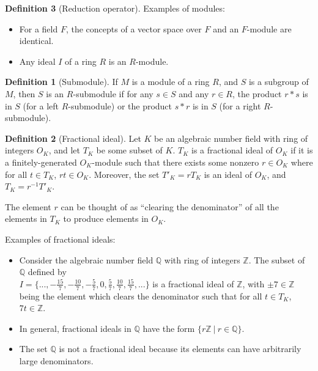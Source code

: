 \documentclass{article}
\theoremstyle{definition}
\newtheorem{definition}{Definition}[section]
\theoremstyle{theorem}
\theoremstyle{example}
\theoremstyle{corollary}
\begin{document}
\begin{definition}[Reduction operator]
\bigskip

Examples of modules:
\begin{itemize}
\item For a field \(F\), the concepts of a vector space over \(F\) and an \(F\)-module are identical.
\item Any ideal \(I\) of a ring \(R\) is an \(R\)-module.
\end{itemize}

\bigskip

\theoremstyle{definition}
\begin{definition}[Submodule]
If \(M\) is a module of a ring \(R\), and \(S\) is a subgroup of \(M\), then \(S\) is an \(R\)-submodule if for any \(s \in S\) and any \(r \in R\), the product \(r * s\) is in \(S\) (for a left \(R\)-submodule) or the product \(s * r\) is in \(S\) (for a right \(R\)-submodule).
\end{definition}

\bigskip

\theoremstyle{definition}
\begin{definition}[Fractional ideal]
Let \(K\) be an algebraic number field with ring of integers \(O_{K}\), and let \(T_{K}\) be some subset of \(K\). \(T_{K}\) is a fractional ideal of \(O_{K}\) if it is a finitely-generated \(O_{K}\)-module such that there exists some nonzero \(r \in O_{K}\) where for all \(t \in T_{K}\), \(r t \in O_{K}\). Moreover, the set \(T'_{K} = r T_{K}\) is an ideal of \(O_{K}\), and \(T_{K} = r^{-1} T'_{K}\).
\end{definition}

\bigskip

The element \(r\) can be thought of as ``clearing the denominator'' of all the elements in \(T_{K}\) to produce elements in \(O_{K}\).

\bigskip

Examples of fractional ideals:
\begin{itemize}
\item Consider the algebraic number field \(\mathbb{Q}\) with ring of integers \(\mathbb{Z}\). The subset of \(\mathbb{Q}\) defined by \\ \(I = \{ . . . , -\frac{15}{7}, -\frac{10}{7}, -\frac{5}{7}, 0, \frac{5}{7}, \frac{10}{7}, \frac{15}{7}, . . . \}\) is a fractional ideal of \(\mathbb{Z}\), with \(\pm 7 \in \mathbb{Z}\) being the element which clears the denominator such that for all \(t \in T_{K}\), \(7t \in \mathbb{Z}\).
\item In general, fractional ideals in \(\mathbb{Q}\) have the form \(\{ r \mathbb{Z} \ | \ r \in \mathbb{Q} \}\).
\item The set \(\mathbb{Q}\) is not a fractional ideal because its elements can have arbitrarily large denominators.
\end{itemize}


\end{definition}
\end{document}
